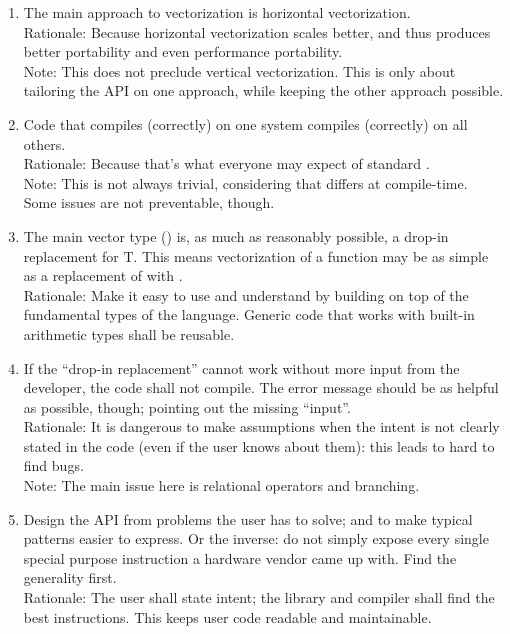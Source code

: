 \begin{enumerate}
  \item\label{design horizontal} The main approach to vectorization is horizontal vectorization.
    \\Rationale: Because horizontal vectorization scales better, and thus produces better portability and even performance portability.
    \\Note: This does not preclude vertical vectorization.
    This is only about tailoring the API on one approach, while keeping the other approach possible.

  \item\label{design portable} Code that compiles (correctly) on one system compiles (correctly) on all others.
    \\Rationale: Because that's what everyone may expect of standard \CC{}.
    \\Note: This is not always trivial, considering that \simd{} differs at compile-time.
    Some issues are not preventable, though.

  \item\label{design drop-in} The main vector type (\simd[<T>]) is, as much as reasonably possible, a drop-in replacement for \type T.
    This means vectorization of a function may be as simple as a replacement of \float with \simd[<float>].
    \\Rationale: Make it easy to use and understand by building on top of the fundamental types of the language.
    Generic code that works with built-in arithmetic types shall be reusable.

  \item\label{design safety}  If the “drop-in replacement” cannot work without more input from the developer, the code shall not compile.
    The error message should be as helpful as possible, though; pointing out the missing “input”.
    \\Rationale: It is dangerous to make assumptions when the intent is not clearly stated in the code (even if the user knows about them): this leads to hard to find bugs.
    \\Note: The main issue here is relational operators and branching.

  \item\label{design user-centered} Design the API from problems the user has to solve; and to make typical patterns easier to express.
    Or the inverse: do not simply expose every single special purpose instruction a hardware vendor came up with.
    Find the generality first.
    \\Rationale: The user shall state intent; the library and compiler shall find the best instructions.
    This keeps user code readable and maintainable.
\end{enumerate}

